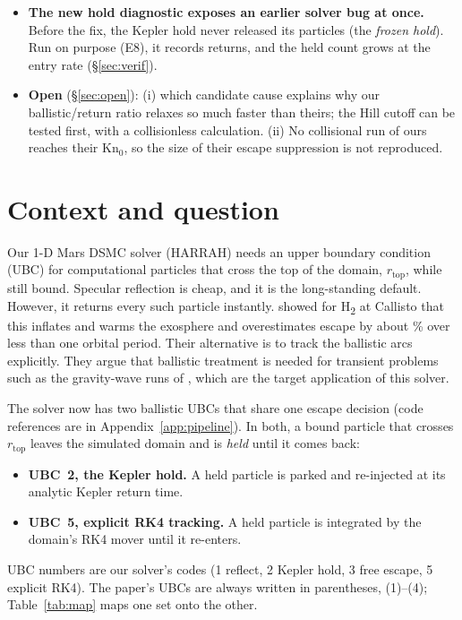 \documentclass[10pt]{article}
\newcommand{\Htwo}{H\textsubscript{2}}
\newcommand{\rtop}{r_\mathrm{top}}
\begin{document}
\begin{tcolorbox}[enhanced, breakable, sharp corners, frame hidden, colback=white,
  borderline west={1.2pt}{0pt}{lightgrey}, left=12pt, right=2pt, top=2pt, bottom=2pt,
  before skip=6pt, after skip=4pt]
\begin{itemize}[leftmargin=1.1em, itemsep=3pt]
  \item \textbf{The new hold diagnostic exposes an earlier solver bug at once.} Before the fix, the Kepler hold never released its particles (the \emph{frozen hold}). Run on purpose (E8), it records \eightReturns{} returns, and the held count grows at the entry rate (\S\ref{sec:verif}).
  \item \textbf{Open} (\S\ref{sec:open}): (i) which candidate cause explains why our ballistic/return ratio relaxes so much faster than theirs; the Hill cutoff can be tested first, with a collisionless calculation. (ii) No collisional run of ours reaches their $\mathrm{Kn}_0$, so the size of their escape suppression is not reproduced.
\end{itemize}
\end{tcolorbox}

\section{Context and question}\label{sec:context}

Our 1-D Mars DSMC solver (HARRAH) needs an upper boundary condition (UBC) for computational particles that cross the top of the domain, $\rtop$, while still bound. Specular reflection is cheap, and it is the long-standing default. However, it returns every such particle instantly. \citet{cm21} showed for \Htwo{} at Callisto that this inflates and warms the exosphere and overestimates escape by about \pOverestimate{}\% over less than one orbital period. Their alternative is to track the ballistic arcs explicitly. They argue that ballistic treatment is needed for transient problems such as the gravity-wave runs of \citet{leclercq20}, which are the target application of this solver.

The solver now has two ballistic UBCs that share one escape decision (code references are in Appendix~\ref{app:pipeline}). In both, a bound particle that crosses $\rtop$ leaves the simulated domain and is \emph{held} until it comes back:
\begin{itemize}
  \item \textbf{UBC~2, the Kepler hold.} A held particle is parked and re-injected at its analytic Kepler return time.
  \item \textbf{UBC~5, explicit RK4 tracking.} A held particle is integrated by the domain's RK4 mover until it re-enters.
\end{itemize}
UBC numbers are our solver's codes (1 reflect, 2 Kepler hold, 3 free escape, 5 explicit RK4). The paper's UBCs are always written in parentheses, (1)–(4); Table~\ref{tab:map} maps one set onto the other.
\end{document}
